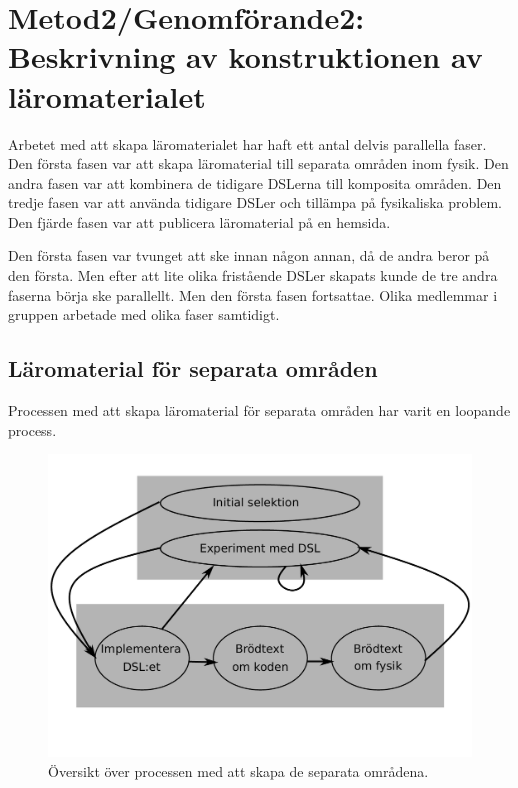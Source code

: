 
\chapter{Metod2/Genomförande2: Beskrivning av konstruktionen av läromaterialet}
\begin{binge}

Arbetet med att skapa läromaterialet har haft ett antal delvis parallella faser. Den första fasen var att skapa läromaterial till separata områden inom fysik. Den andra fasen var att kombinera de tidigare DSLerna till komposita områden. Den tredje fasen var att använda tidigare DSLer och tillämpa på fysikaliska problem. Den fjärde fasen var att publicera läromaterial på en hemsida.

Den första fasen var tvunget att ske innan någon annan, då de andra beror på den första. Men efter att lite olika fristående DSLer skapats kunde de tre andra faserna börja ske parallellt. Men den första fasen fortsattae. Olika medlemmar i gruppen arbetade med olika faser samtidigt.

\section{Läromaterial för separata områden}

Processen med att skapa läromaterial för separata områden har varit en loopande process.

\begin{figure}
  \includegraphics[width=\linewidth]{figure/oeversikt_metod_process.pdf}
  \caption{Översikt över processen med att skapa de separata områdena.}
  \label{fig:oeversikt_separata}
\end{figure}


\end{binge}

